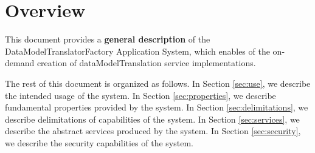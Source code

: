 \documentclass[a4paper]{arrowhead}
\begin{document}
\ArrowheadDate{\today}
\ArrowheadSetup

\begin{center}
  \vspace*{1cm}
  \huge{\arrowtitle}

  \vspace*{0.2cm}
  \LARGE{\arrowtype}
  \vspace*{1cm}

  \vspace*{\fill}


  \vspace*{1cm}
  \vspace*{\fill}

  \begin{abstract}
    This document provides system description for the \textbf{DataModelTranslatorFactory Application System}.
  \end{abstract}

  \vspace*{1cm}

 \end{center}

\newpage

\tableofcontents
\newpage

\section{Overview}
\label{sec:overview}
\color{black}
This document provides a \textbf{general description} of the DataModelTranslatorFactory Application System, which enables of the on-demand creation of dataModelTranslation service implementations.

The rest of this document is organized as follows.
In Section \ref{sec:use}, we describe the intended usage of the system.
In Section \ref{sec:properties}, we describe fundamental properties
provided by the system.
In Section \ref{sec:delimitations}, we describe delimitations of capabilities
of the system.
In Section \ref{sec:services}, we describe the abstract services produced by the system.
In Section \ref{sec:security}, we describe the security capabilities
of the system.
\end{document}

